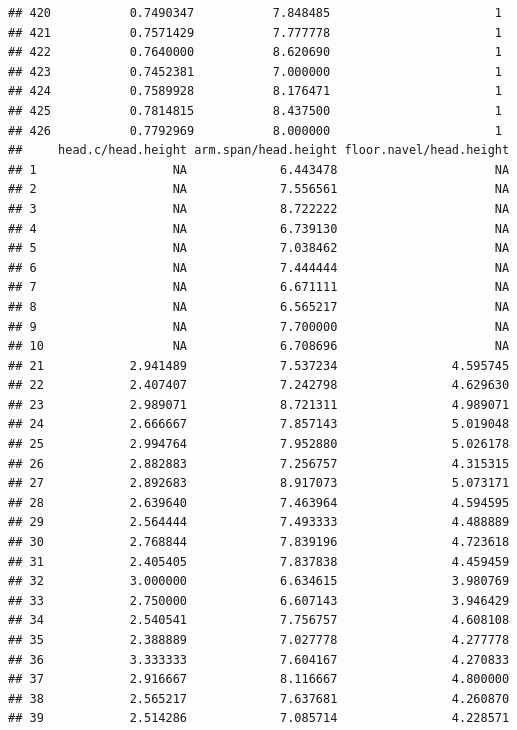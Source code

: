 \documentclass[]{article}
\begin{document}
\begin{verbatim}
## 420           0.7490347           7.848485                       1
## 421           0.7571429           7.777778                       1
## 422           0.7640000           8.620690                       1
## 423           0.7452381           7.000000                       1
## 424           0.7589928           8.176471                       1
## 425           0.7814815           8.437500                       1
## 426           0.7792969           8.000000                       1
##     head.c/head.height arm.span/head.height floor.navel/head.height
## 1                   NA             6.443478                      NA
## 2                   NA             7.556561                      NA
## 3                   NA             8.722222                      NA
## 4                   NA             6.739130                      NA
## 5                   NA             7.038462                      NA
## 6                   NA             7.444444                      NA
## 7                   NA             6.671111                      NA
## 8                   NA             6.565217                      NA
## 9                   NA             7.700000                      NA
## 10                  NA             6.708696                      NA
## 21            2.941489             7.537234                4.595745
## 22            2.407407             7.242798                4.629630
## 23            2.989071             8.721311                4.989071
## 24            2.666667             7.857143                5.019048
## 25            2.994764             7.952880                5.026178
## 26            2.882883             7.256757                4.315315
## 27            2.892683             8.917073                5.073171
## 28            2.639640             7.463964                4.594595
## 29            2.564444             7.493333                4.488889
## 30            2.768844             7.839196                4.723618
## 31            2.405405             7.837838                4.459459
## 32            3.000000             6.634615                3.980769
## 33            2.750000             6.607143                3.946429
## 34            2.540541             7.756757                4.608108
## 35            2.388889             7.027778                4.277778
## 36            3.333333             7.604167                4.270833
## 37            2.916667             8.116667                4.800000
## 38            2.565217             7.637681                4.260870
## 39            2.514286             7.085714                4.228571

\end{verbatim}
\end{document}
